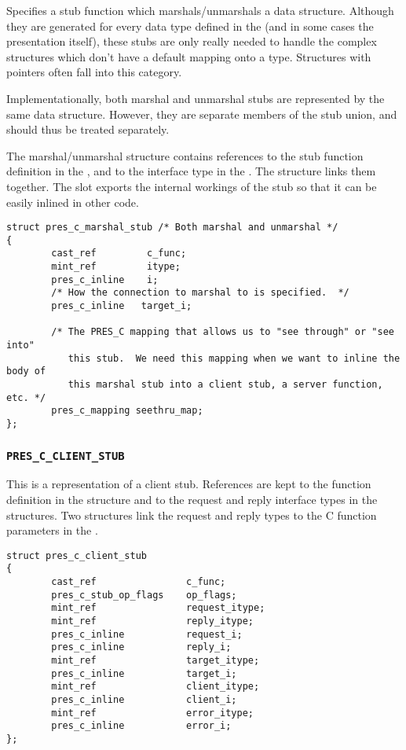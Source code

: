 Specifies a stub function which marshals/unmarshals a data structure.  Although
they are generated for every data type defined in the \IDL{} (and in some cases
the presentation itself), these stubs are only really needed to handle the
complex structures which don't have a default mapping onto a \MINT{} type.
Structures with pointers often fall into this category.

Implementationally, both marshal and unmarshal stubs are represented by the
same data structure.  However, they are separate members of the stub union, and
should thus be treated separately.

The marshal/unmarshal structure contains references to the stub function
definition in the \CAST{}, and to the interface type in the \MINT{}\@.  The
 structure links them together.  The
 slot exports the internal workings of the stub so
that it can be easily inlined in other code.

\begin{verbatim}
struct pres_c_marshal_stub /* Both marshal and unmarshal */
{
        cast_ref         c_func;
        mint_ref         itype;
        pres_c_inline    i;
        /* How the connection to marshal to is specified.  */
        pres_c_inline   target_i;

        /* The PRES_C mapping that allows us to "see through" or "see into"
           this stub.  We need this mapping when we want to inline the body of
           this marshal stub into a client stub, a server function, etc. */
        pres_c_mapping seethru_map;
};
\end{verbatim}

\subsubsection{\texttt{PRES\_C\_CLIENT\_STUB}}

This is a representation of a client stub.  References are kept to the function
definition in the \CAST{} structure and to the request and reply interface
types in the \MINT{} structures.  Two  structures link the
request and reply types to the C function parameters in the \CAST{}\@.

\begin{verbatim}
struct pres_c_client_stub
{
        cast_ref                c_func;
        pres_c_stub_op_flags    op_flags;
        mint_ref                request_itype;
        mint_ref                reply_itype;
        pres_c_inline           request_i;
        pres_c_inline           reply_i;
        mint_ref                target_itype;
        pres_c_inline           target_i;
        mint_ref                client_itype;
        pres_c_inline           client_i;
        mint_ref                error_itype;
        pres_c_inline           error_i;
};
\end{verbatim}

